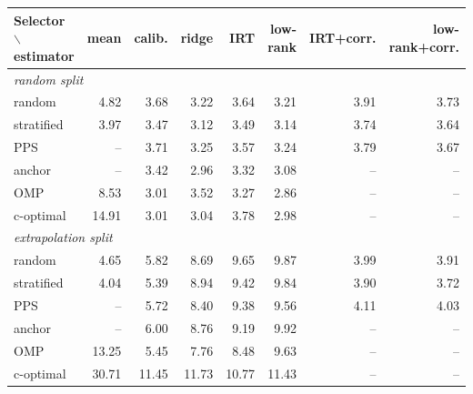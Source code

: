 {\scriptsize\setlength{\tabcolsep}{3pt}
\begin{tabular}{lrrrrrrr}
\toprule
Selector $\backslash$ estimator & mean & calib. & ridge & IRT & low-rank & IRT+corr. & low-rank+corr. \\
\midrule
\multicolumn{8}{l}{\emph{random split}} \\
random & 4.82 & 3.68 & 3.22 & 3.64 & 3.21 & 3.91 & 3.73 \\
stratified & 3.97 & 3.47 & 3.12 & 3.49 & 3.14 & 3.74 & 3.64 \\
PPS & -- & 3.71 & 3.25 & 3.57 & 3.24 & 3.79 & 3.67 \\
anchor & -- & 3.42 & 2.96 & 3.32 & 3.08 & -- & -- \\
OMP & 8.53 & 3.01 & 3.52 & 3.27 & 2.86 & -- & -- \\
c-optimal & 14.91 & 3.01 & 3.04 & 3.78 & 2.98 & -- & -- \\
\multicolumn{8}{l}{\emph{extrapolation split}} \\
random & 4.65 & 5.82 & 8.69 & 9.65 & 9.87 & 3.99 & 3.91 \\
stratified & 4.04 & 5.39 & 8.94 & 9.42 & 9.84 & 3.90 & 3.72 \\
PPS & -- & 5.72 & 8.40 & 9.38 & 9.56 & 4.11 & 4.03 \\
anchor & -- & 6.00 & 8.76 & 9.19 & 9.92 & -- & -- \\
OMP & 13.25 & 5.45 & 7.76 & 8.48 & 9.63 & -- & -- \\
c-optimal & 30.71 & 11.45 & 11.73 & 10.77 & 11.43 & -- & -- \\
\bottomrule
\end{tabular}}
